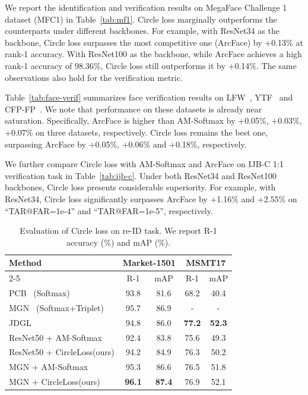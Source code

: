 \documentclass[10pt,twocolumn,letterpaper]{article}
\begin{document}
We report the identification and verification results on MegaFace Challenge 1 dataset (MFC1) in Table~\ref{tab:mf1}. Circle loss marginally outperforms the counterparts under different backbones. For example, with ResNet34 as the backbone, Circle loss surpasses the most competitive one (ArcFace) by +0.13\% at rank-1 accuracy. With ResNet100 as the backbone, while ArcFace achieves a high rank-1 accuracy of 98.36\%, Circle loss still outperforms it by +0.14\%. The same observations also hold for the verification metric.

Table~\ref{tab:face-verif} summarizes face verification results on LFW~\cite{LFWTech}, YTF~\cite{wolf2011face} and CFP-FP~\cite{cfp-paper}.
We note that performance on these datasets is already near saturation. Specifically, ArcFace is higher than AM-Softmax by +0.05\%, +0.03\%, +0.07\% on three datasets, respectively. Circle loss remains the best one, surpassing ArcFace by +0.05\%, +0.06\% and +0.18\%, respectively.

We further compare Circle loss with AM-Softmax and ArcFace on IJB-C 1:1 verification task in Table~\ref{tab:ijb-c}. Under both ResNet34 and ResNet100 backbones, Circle loss presents considerable superiority. For example, with ResNet34, Circle loss significantly surpasses ArcFace by +1.16\% and +2.55\% on ``TAR@FAR=1e-4'' and ``TAR@FAR=1e-5'', respectively.


\begin{table}[t]
    \small
    \centering
    \caption{Evaluation of Circle loss on re-ID task. We report R-1 accuracy (\%) and mAP (\%). }
    \label{tab:person-reid}
    \begin{tabular}{lcccc}
    \toprule
     \multirow{2}{*}{Method} & \multicolumn{2}{c}{Market-1501} & \multicolumn{2}{c}{MSMT17}\\
     \cmidrule{2-5}
     & R-1 & mAP & R-1& mAP \\
     \midrule
     PCB~\cite{Sun_2018_ECCVPCB} (Softmax)&93.8&81.6&68.2&40.4\\
     MGN~\cite{Wang_2018MGN} (Softmax+Triplet) &95.7&86.9&-&-\\
     JDGL~\cite{Zheng_2019_CVPRJDGL} &94.8&86.0&\textbf{77.2}&\textbf{52.3}\\

    ResNet50 + AM-Softmax &92.4&83.8&75.6&49.3\\
    ResNet50 + CircleLoss(ours) &94.2& 84.9 &76.3&50.2\\
    MGN + AM-Softmax &95.3&86.6&76.5&51.8\\
    MGN + CircleLoss(ours) &\textbf{96.1}&\textbf{87.4}&{76.9}&{52.1}\\
    \bottomrule
    \end{tabular}
\end{table}
\end{document}
